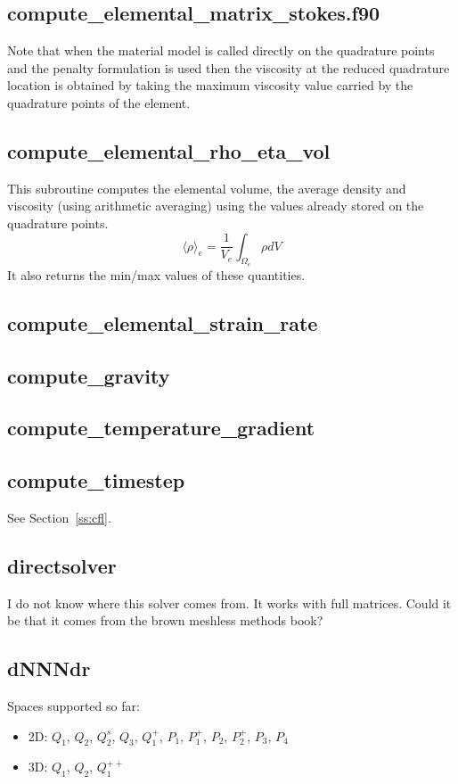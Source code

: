  \subsection{compute\_elemental\_matrix\_stokes.f90}
 Note that when the material model is called directly on the quadrature points and 
 the penalty formulation is used then the viscosity at the reduced quadrature location 
 is obtained by taking the maximum viscosity value carried by the quadrature points of 
 the element. 
 \subsection{compute\_elemental\_rho\_eta\_vol}
 This subroutine computes the elemental volume, the average density and 
 viscosity (using arithmetic averaging) using the values already stored on the quadrature points. 
 \[
 \langle \rho \rangle_e =\frac{1}{V_e} \int_{\Omega_e} \rho dV
 \]
 It also returns the min/max values of these quantities.
 \subsection{compute\_elemental\_strain\_rate}

 \subsection{compute\_gravity}

 \subsection{compute\_temperature\_gradient}

 \subsection{compute\_timestep}
 See Section~\ref{ss:cfl}.
 \subsection{directsolver}
  I do not know where this solver comes from. It works with full matrices.
 Could it be that it comes from the brown meshless methods book?
 \subsection{dNNNdr}
 Spaces supported so far:
 \begin{itemize}
 \item 2D: $Q_1$, $Q_2$, $Q_2^s$, $Q_3$, $Q_1^+$, $P_1$, $P_1^+$, $P_2$, $P_2^+$, $P_3$, $P_4$
 \item 3D: $Q_1$, $Q_2$, $Q_1^{++}$
 \end{itemize}
